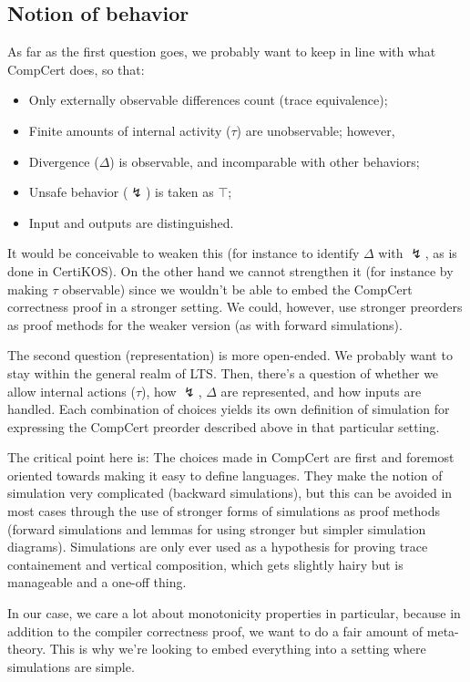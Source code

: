 \documentclass[11pt]{article}
\begin{document}
\subsection{Notion of behavior} %

As far as the first question goes,
we probably want to keep in line with what CompCert does,
so that:
\begin{itemize}
\item Only externally observable differences count (trace equivalence);
\item Finite amounts of internal activity ($\tau$) are unobservable;
  however,
\item Divergence ($\Delta$) is observable,
  and incomparable with other behaviors;
\item Unsafe behavior ($\lightning$) is taken as $\top$;
\item Input and outputs are distinguished.
\end{itemize}
It would be conceivable to weaken this
(for instance to identify $\Delta$ with $\lightning$,
as is done in CertiKOS).
On the other hand we cannot strengthen it
(for instance by making $\tau$ observable)
since we wouldn't be able to embed
the CompCert correctness proof in a stronger setting.
We could, however,
use stronger preorders as proof methods
for the weaker version
(as with forward simulations).

The second question (representation) is more open-ended.
We probably want to stay within the general realm of LTS.
Then, there's a question of
whether we allow internal actions ($\tau$),
how $\lightning$, $\Delta$ are represented,
and how inputs are handled.
Each combination of choices yields
its own definition of simulation for
expressing the CompCert preorder described above
in that particular setting.

The critical point here is:
The choices made in CompCert
are first and foremost oriented towards
making it easy to define languages.
They make the notion of simulation
very complicated (backward simulations),
but this can be avoided in most cases
through the use of stronger forms of simulations
as proof methods
(forward simulations and
lemmas for using stronger but simpler simulation diagrams).
Simulations are only ever used as a hypothesis
for proving trace containement
and vertical composition,
which gets slightly hairy but is manageable
and a one-off thing.

In our case,
we care a lot about monotonicity properties in particular,
because in addition to the compiler correctness proof,
we want to do a fair amount of meta-theory.
This is why we're looking to embed everything
into a setting where simulations are simple.
\end{document}
